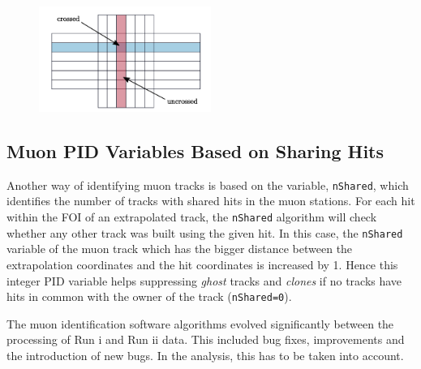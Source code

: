 \DIFaddbegin \begin{figure}[!h]
        \centering
        \includegraphics[width = 0.5\textwidth]{figs/trimuon/crossedhits.pdf}
	\caption{}
        \label{fig:pads}
\end{figure}


\DIFaddend \subsection{Muon PID Variables Based on Sharing Hits }
\label{bugs}

Another way of identifying muon tracks is based on the variable, \texttt{nShared}, which identifies the number of tracks with shared hits in the muon stations. For each hit within the \gls{FOI} of an extrapolated track, the \texttt{nShared} algorithm will check whether any other track was built using the given hit. In this case, the \texttt{nShared} variable of the muon track which has the bigger distance between the extrapolation coordinates and the hit coordinates is increased by 1. Hence this integer \gls{PID} variable helps suppressing \textit{ghost} tracks and \textit{clones} if no tracks have hits in common with the owner of the track (\texttt{nShared=0}).

The muon identification software algorithms evolved significantly between the processing of Run \Rn{1} and Run \Rn{2} data. This included bug fixes, improvements and the introduction of new bugs. In the \Bmumumu analysis, this has to be taken into account.


